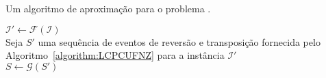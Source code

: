 \begin{algorithm}[!tbh]
  \caption{Um algoritmo de aproximação para o problema \SbIRT{}.\label{algorithm:WTARSEZM}}
  $\mathcal{I'} \gets \mathcal{F}(\mathcal{I})$ \\
  Seja $S'$ uma sequência de eventos de reversão e transposição fornecida pelo Algoritmo~\ref{algorithm:LCPCUFNZ} para a instância $\mathcal{I'}$ \\
  $S\gets \mathcal{G}(S')$ \\
\end{algorithm}